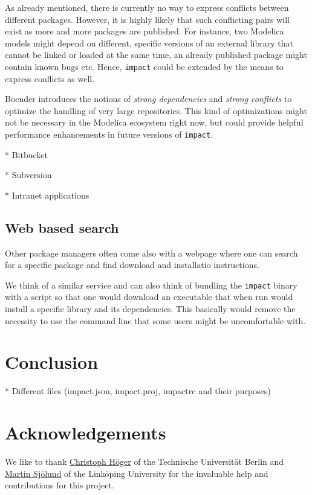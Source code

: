 \documentclass[11pt,a4paper,twocolumn]{article}
\renewcommand{\normalsize}{\fontsize{10.5pt}{12.3pt}\selectfont}
\renewcommand{\small}{\fontsize{9.5pt}{11.1pt}\selectfont}
\newcommand{\code}[1]{\texttt{#1}} %
\begin{document}
As already mentioned, there is currently no way to express conflicts
between different packages.  However, it is highly likely that such
conflicting pairs will exist as more and more packages are published.
For instance, two Modelica models might depend on different, specific
versions of an external library that cannot be linked or loaded at the
same time, an already published package might contain known bugs etc.
Hence, \code{impact} could be extended by the means to express
conflicts as well.

Boender introduces the notions of \emph{strong dependencies} and
\emph{strong conflicts} to optimize the handling of very large
repositories.  This kind of optimizations might not be necessary in
the Modelica ecosystem right now, but could provide helpful
performance enhancements in future versions of \code{impact}.

* Bitbucket

* Subversion

* Intranet applications

\subsection{Web based search}
Other package managers often come also with a webpage where one can
search for a specific package and find download and installatio
instructions.

We think of a similar service and can also think of bundling the
\code{impact} binary with a script so that
one would download an executable that when run would install a
specific library and its dependencies. This basically would remove the
necessity to use the command line that some users might be
uncomfortable with.

\section{Conclusion}

* Different files (impact.json, impact.proj, impactrc and their purposes)

\section{Acknowledgements}
\label{sec:acknowledgements}
We like to thank \href{mailto:christoph.hoeger@tu-berlin.de}{Christoph H\"oger} of the Technische Universit\"at Berlin and \href{mailto:martin.sjolund@liu.se}{Martin Sj\"olund} of the Link\"oping University for the invaluable help and contributions for this project.


\small
\printbibliography
\normalsize
\end{document}
